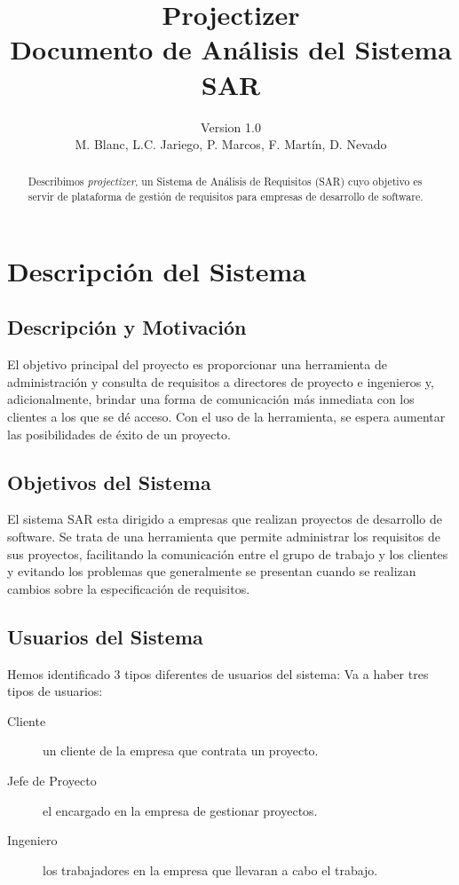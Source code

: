 \documentclass[a4paper, spanish]{article}
\title{Projectizer \\ Documento de Análisis del Sistema SAR}
\author{Version 1.0 \\ M. Blanc, L.C. Jariego, P. Marcos, F. Martín, D. Nevado}
\begin{document}
\maketitle
\begin{abstract}
Describimos \textit{projectizer}, un Sistema de Análisis de Requisitos (SAR) cuyo objetivo es servir de plataforma de gestión de requisitos para empresas de desarrollo de software.
\end{abstract}
\vspace{\fill}
\tableofcontents
\let\oldsection\section\renewcommand\section{\clearpage\oldsection}

\section{Descripción del Sistema}
\subsection{Descripción y Motivación}
El objetivo principal del proyecto es proporcionar una herramienta de administración y consulta de requisitos a directores de proyecto e ingenieros y, adicionalmente, brindar una forma de comunicación más inmediata con los clientes a los que se dé acceso.
Con el uso de la herramienta, se espera aumentar las posibilidades de éxito de un proyecto.


\subsection{Objetivos del Sistema}
El sistema SAR esta dirigido a empresas que realizan proyectos de desarrollo de
software. Se trata de una herramienta que permite administrar los requisitos
de sus proyectos, facilitando la comunicación entre el grupo de trabajo y los
clientes y evitando los problemas que generalmente se presentan cuando se realizan
cambios sobre la especificación de requisitos.

\subsection{Usuarios del Sistema}\label{sec:usuarios}
Hemos identificado 3 tipos diferentes de usuarios del sistema:
Va a haber tres tipos de usuarios:
\begin{description}
  \item [Cliente] un cliente de la empresa que contrata un proyecto.
  \item [Jefe de Proyecto] el encargado en la empresa de gestionar proyectos.
  \item [Ingeniero] los trabajadores en la empresa que llevaran a cabo el trabajo.
\end{description}
\end{document}
